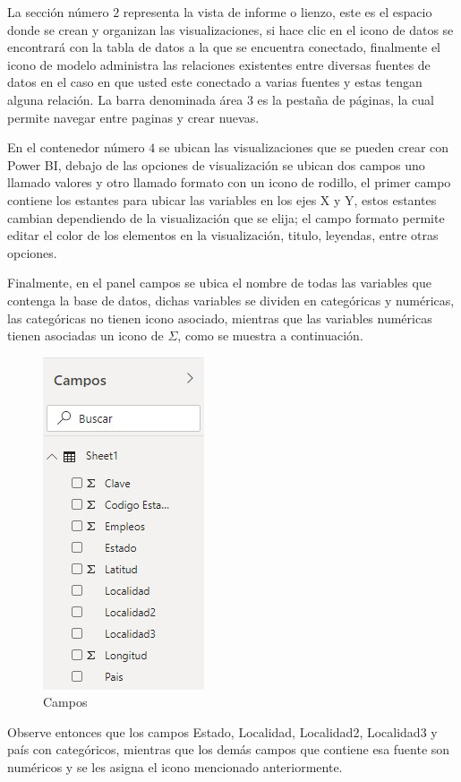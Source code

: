 \documentclass[
]{book}
\begin{document}
La sección número \(2\) representa la vista de informe o lienzo, este es el espacio donde se crean y organizan las visualizaciones, si hace clic en el icono de datos se encontrará con la tabla de datos a la que se encuentra conectado, finalmente el icono de modelo administra las relaciones existentes entre diversas fuentes de datos en el caso en que usted este conectado a varias fuentes y estas tengan alguna relación. La barra denominada área \(3\) es la pestaña de páginas, la cual permite navegar entre paginas y crear nuevas.

En el contenedor número \(4\) se ubican las visualizaciones que se pueden crear con Power BI, debajo de las opciones de visualización se ubican dos campos uno llamado valores y otro llamado formato con un icono de rodillo, el primer campo contiene los estantes para ubicar las variables en los ejes X y Y, estos estantes cambian dependiendo de la visualización que se elija; el campo formato permite editar el color de los elementos en la visualización, titulo, leyendas, entre otras opciones.

Finalmente, en el panel campos se ubica el nombre de todas las variables que contenga la base de datos, dichas variables se dividen en categóricas y numéricas, las categóricas no tienen icono asociado, mientras que las variables numéricas tienen asociadas un icono de \(\Sigma\), como se muestra a continuación.

\begin{figure}

{\centering \includegraphics[width=0.2\linewidth]{Imágenes/powerbi7} 

}

\caption{Campos}\label{fig:campospowerbi-fig}
\end{figure}

Observe entonces que los campos Estado, Localidad, Localidad2, Localidad3 y país con categóricos, mientras que los demás campos que contiene esa fuente son numéricos y se les asigna el icono mencionado anteriormente.
\end{document}
